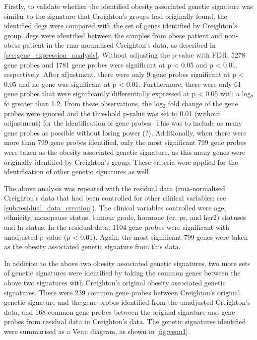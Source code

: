 Firstly, to validate whether the identified obesity associated genetic signature was similar to the signature that Creighton's groups had originally found, the identified \glspl{deg} were compared with the set of genes identified by Creighton's group.
\glspl{deg}  were identified between the samples from obese patient and non-obese patient in the \gls{rma}-normalised Creighton's data, as described in \cref{sec:gene_expression_analysis}.
Without adjusting the p-value with FDR, 5278 gene probes and 1781 gene probes were significant at p \textless{} 0.05 and p \textless{} 0.01, respectively.
After afjustment, there were only 9 gene probes significant at p \textless{} 0.05 and no gene was significant at p \textless{} 0.01.
Furthermore, there were only 61 gene probes that were significantly differentially expressed at p \textless{} 0.05 with a log$_2$ \gls{fc} greater than 1.2.
From these observations, the log$_2$ fold change of the gene probes were ignored and the threshold p-value was set to 0.01 (without adjustment) for the identification of gene probes.
This was to include as many gene probes as possible without losing power (?).
Additionally, when there were more than 799 gene probes identified, only the most significant 799 gene probes were taken as the obesity associated genetic signature, as this many genes were originally identified by Creighton's group.
These criteria were applied for the identification of other genetic signatures as well.

The above analysis was repeated with the residual data (\gls{rma}-normalised Creighton's data that had been controlled for other clinical variables; see \cref{sub:residual_data_creation}).
The clinical variables controlled were age, ethnicity, menopause status, tumour grade, hormone (\gls{er}, \gls{pr}, and \gls{her2}) statuses  and \gls{ln} status.
In the residual data, 1104 gene probes were significant with unadjusted p-value (p \textless{} 0.01).
Again, the most significant 799 genes were taken as the obesity associated genetic signature from this data.

In addition to the above two obesity associated genetic signatures, two more sets of genetic signatures were identified by taking the common genes between the above two signatures with Creighton's original obesity associated genetic signatures.
There were 239 common gene probes between Creighton's original genetic signature and the gene probes identified from the unadjusted Creighton's data, and 168 common gene probes between the original signature and gene probes from residual data in Creighton's data.
The genetic signatures identified were summarised as a Venn diagram, as shown in \cref{fig:venn1}.
\\

